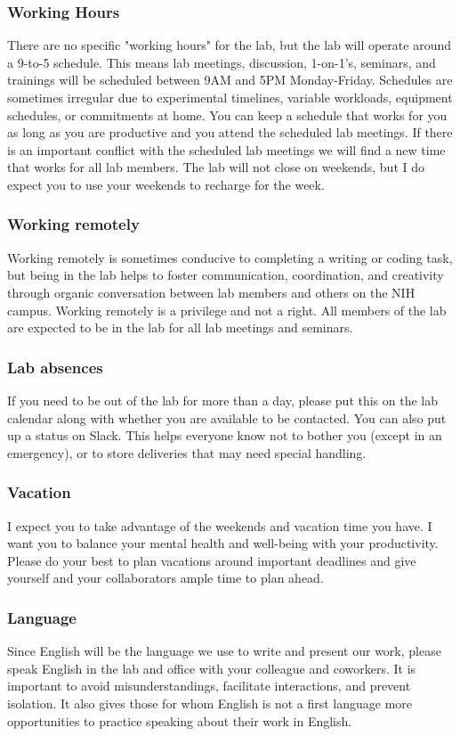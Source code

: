 \documentclass[10pt, a4paper, twocolumn]{article} %
\begin{document}
\subsubsection{Working Hours}
There are no specific "working hours" for the lab, but the lab will operate around a 9-to-5 schedule. This means lab meetings, discussion, 1-on-1's, seminars, and trainings will be scheduled between 9AM and 5PM Monday-Friday. Schedules are sometimes irregular due to experimental timelines, variable workloads, equipment schedules, or commitments at home. You can keep a schedule that works for you as long as you are productive and you attend the scheduled lab meetings. If there is an important conflict with the scheduled lab meetings we will find a new time that works for all lab members. The lab will not close on weekends, but I do expect you to use your weekends to recharge for the week.

\subsubsection{Working remotely} Working remotely is sometimes conducive to completing a writing or coding task, but being in the lab helps to foster communication, coordination, and creativity through organic conversation between lab members and others on the NIH campus. Working remotely is a privilege and not a right. All members of the lab are expected to be in the lab for all lab meetings and seminars.

\subsubsection{Lab absences} If you need to be out of the lab for more than a day, please put this on the lab calendar along with whether you are available to be contacted. You can also put up a status on Slack. This helps everyone know not to bother you (except in an emergency), or to store deliveries that may need special handling.

\subsubsection{Vacation} I expect you to take advantage of the weekends and vacation time you have. I want you to balance your mental health and well-being with your productivity. Please do your best to plan vacations around important deadlines and give yourself and your collaborators ample time to plan ahead.

\subsubsection{Language}
Since English will be the language we use to write and present our work, please speak English in the lab and office with your colleague and coworkers. It is important to avoid misunderstandings, facilitate interactions, and prevent isolation. It also gives those for whom English is not a first language more opportunities to practice speaking about their work in English.
\end{document}
